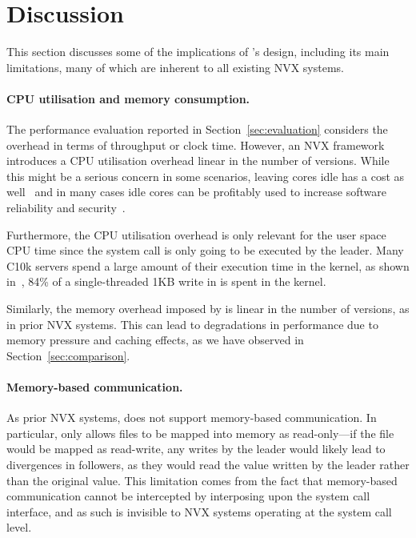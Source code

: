 \section{Discussion}
\label{efficient-execution:discussion}

This section discusses some of the implications of \varan's design,
including its main limitations, many of which are inherent to all
existing NVX systems.

\paragraph{CPU utilisation and memory consumption.} The performance
evaluation reported in Section~\ref{sec:evaluation} considers the
overhead in terms of throughput or clock time.  However, an NVX
framework introduces a CPU utilisation overhead linear in the number
of versions.  While this might be a serious concern in some scenarios,
leaving cores idle has a cost as well~\cite{barroso2007} and in many
cases idle cores can be profitably used to increase software reliability
and security~\cite{cox2006,multiplicity,orchestra09,diehard06,mvupdates12}.

Furthermore, the CPU utilisation overhead is only relevant for the user space
CPU time since the system call is only going to be executed by the leader. Many
C10k servers spend a large amount of their execution time in the kernel, \ie as
shown in~\cite{redisoverhead}, 84\% of a single-threaded 1KB write in \redis
is spent in the kernel. %

Similarly, the memory overhead imposed by \varan is linear in the
number of versions, as in prior NVX systems.  This can lead to
degradations in performance due to memory pressure and caching
effects, as we have observed in Section~\ref{sec:comparison}.

\paragraph{Memory-based communication.} As prior NVX systems, \varan
does not support memory-based communication.  In particular, \varan
only allows files to be mapped into memory as read-only---if the file
would be mapped as read-write, any writes by the leader would likely
lead to divergences in followers, as they would read the value written
by the leader rather than the original value.  This limitation comes
from the fact that memory-based communication cannot be intercepted by
interposing upon the system call interface, and as such is invisible
to NVX systems operating at the system call level.


